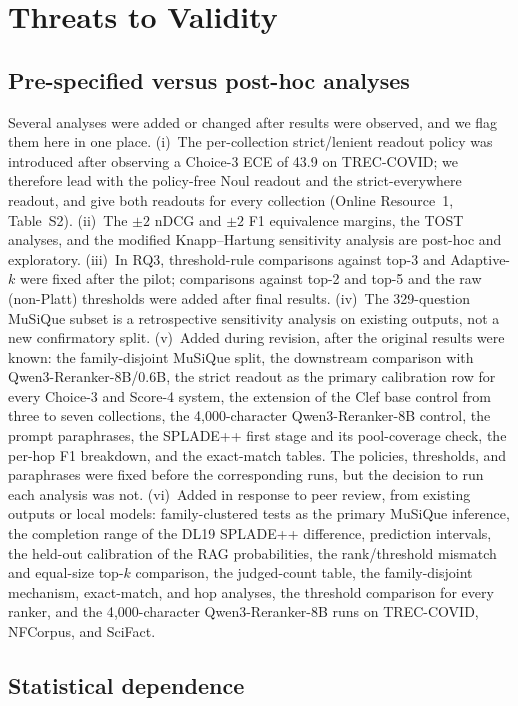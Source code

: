 \section{Threats to Validity}

\subsection{Pre-specified versus post-hoc analyses}

Several analyses were added or changed after results were observed, and we flag them here in one place. (i)~The per-collection strict/lenient readout policy was introduced after observing a Choice-3 ECE of 43.9 on TREC-COVID; we therefore lead with the policy-free Noul readout and the strict-everywhere readout, and give both readouts for every collection (Online Resource~1, Table~S2). (ii)~The $\pm2$ nDCG and $\pm2$ F1 equivalence margins, the TOST analyses, and the modified Knapp--Hartung sensitivity analysis are post-hoc and exploratory. (iii)~In RQ3, threshold-rule comparisons against top-3 and Adaptive-$k$ were fixed after the pilot; comparisons against top-2 and top-5 and the raw (non-Platt) thresholds were added after final results. (iv)~The 329-question MuSiQue subset is a retrospective sensitivity analysis on existing outputs, not a new confirmatory split. (v)~Added during revision, after the original results were known: the family-disjoint MuSiQue split, the downstream comparison with Qwen3-Reranker-8B/0.6B, the strict readout as the primary calibration row for every Choice-3 and Score-4 system, the extension of the Clef base control from three to seven collections, the 4{,}000-character Qwen3-Reranker-8B control, the prompt paraphrases, the SPLADE++ first stage and its pool-coverage check, the per-hop F1 breakdown, and the exact-match tables. The policies, thresholds, and paraphrases were fixed before the corresponding runs, but the decision to run each analysis was not. (vi)~Added in response to peer review, from existing outputs or local models: family-clustered tests as the primary MuSiQue inference, the completion range of the DL19 SPLADE++ difference, prediction intervals, the held-out calibration of the RAG probabilities, the rank/threshold mismatch and equal-size top-$k$ comparison, the judged-count table, the family-disjoint mechanism, exact-match, and hop analyses, the threshold comparison for every ranker, and the 4{,}000-character Qwen3-Reranker-8B runs on TREC-COVID, NFCorpus, and SciFact.

\subsection{Statistical dependence}

